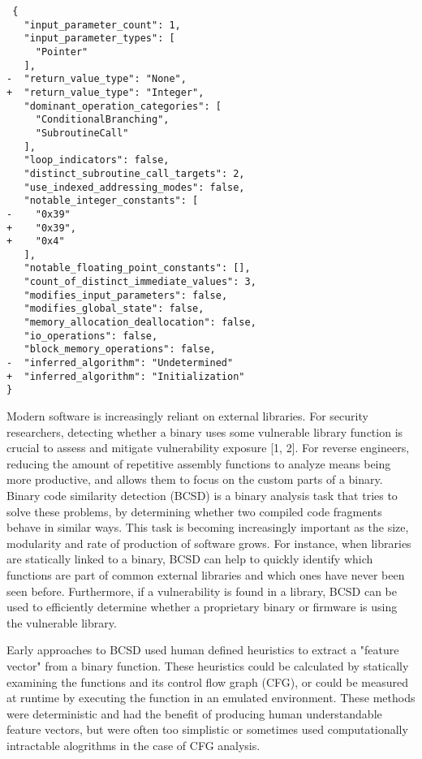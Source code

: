 \documentclass[conference,compsoc]{IEEEtran}
\begin{document}
\begin{verbatim}
 {
   "input_parameter_count": 1,
   "input_parameter_types": [
     "Pointer"
   ],
-  "return_value_type": "None",
+  "return_value_type": "Integer",
   "dominant_operation_categories": [
     "ConditionalBranching",
     "SubroutineCall"
   ],
   "loop_indicators": false,
   "distinct_subroutine_call_targets": 2,
   "use_indexed_addressing_modes": false,
   "notable_integer_constants": [
-    "0x39"
+    "0x39",
+    "0x4"
   ],
   "notable_floating_point_constants": [],
   "count_of_distinct_immediate_values": 3,
   "modifies_input_parameters": false,
   "modifies_global_state": false,
   "memory_allocation_deallocation": false,
   "io_operations": false,
   "block_memory_operations": false,
-  "inferred_algorithm": "Undetermined"
+  "inferred_algorithm": "Initialization"
}
\end{verbatim}

Modern software is increasingly reliant on external libraries.
For security researchers, detecting whether a binary uses some vulnerable library function is crucial to assess
and mitigate vulnerability exposure [1, 2]. For reverse engineers, reducing the amount of repetitive assembly functions
to analyze means being more productive, and allows them to focus on the custom parts of a binary.  Binary code similarity
detection (BCSD) is a binary analysis task that tries to solve these problems, by determining whether two compiled
code fragments behave in similar ways. This task is becoming increasingly important as the size, modularity and rate of
production of software grows.  For instance, when libraries are statically linked to a binary, BCSD can help to
quickly identify which functions are part of common external libraries and which ones have never been seen before.
Furthermore, if a vulnerability is found in a library, BCSD can be used to efficiently determine whether a proprietary
binary or firmware is using the vulnerable library.

Early approaches to BCSD used human defined heuristics to extract a "feature vector" from a binary function. These heuristics
could be calculated by statically examining the functions and its control flow graph (CFG), or could be measured at runtime
by executing the function in an emulated environment. These methods were deterministic and had the benefit of producing
human understandable feature vectors, but were often too simplistic or sometimes used computationally intractable alogrithms in
the case of CFG analysis.
\end{document}
